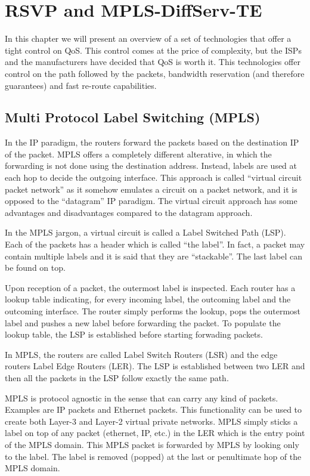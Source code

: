 \chapter{RSVP and MPLS-DiffServ-TE}

In this chapter we will present an overview of a set of technologies that offer a tight control on QoS.
This control comes at the price of complexity, but the ISPs and the manufacturers have decided that QoS is worth it.
This technologies offer control on the path followed by the packets, bandwidth reservation (and therefore guarantees) and fast re-route capabilities.

\section{Multi Protocol Label Switching (MPLS)}

In the IP paradigm, the routers forward the packets based on the destination IP of the packet.
MPLS offers a completely different alterative, in which the forwarding is not done using the destination address.
Instead, labels are used at each hop to decide the outgoing interface.
This approach is called ``virtual circuit packet network'' as it somehow emulates a circuit on a packet network, and it is opposed to the ``datagram'' IP paradigm.
The virtual circuit approach has some advantages and disadvantages compared to the datagram approach.

In the MPLS jargon, a virtual circuit is called a Label Switched Path (LSP).
Each of the packets has a header which is called ``the label''.
In fact, a packet may contain multiple labels and it is said that they are ``stackable''.
The last label can be found on top.

Upon reception of a packet, the outermost label is inspected.
Each router has a lookup table indicating, for every incoming label, the outcoming label and the outcoming interface.
The router simply performs the lookup, pops the outermost label and pushes a new label before forwarding the packet.
To populate the lookup table, the LSP is established before starting forwading packets.

In MPLS, the routers are called Label Switch Routers (LSR) and the edge routers Label Edge Routers (LER).
The LSP is established between two LER and then all the packets in the LSP follow exactly the same path.

MPLS is protocol agnostic in the sense that can carry any kind of packets.
Examples are IP packets and Ethernet packets.
This functionality can be used to create both Layer-3 and Layer-2 virtual private networks.
MPLS simply sticks a label on top of any packet (ethernet, IP, etc.)  in the LER which is the entry point of the MPLS domain.
This MPLS packet is forwarded by MPLS by looking only to the label.
The label is removed (popped) at the last or penultimate hop of the MPLS domain.

